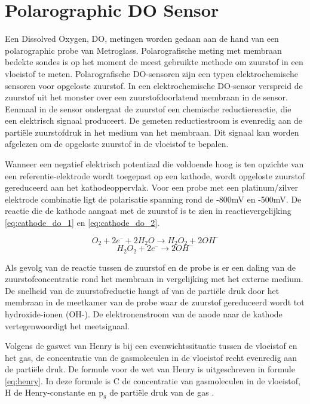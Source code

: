 \section{Polarographic DO Sensor}
Een Dissolved Oxygen, DO, metingen worden gedaan aan de hand van een polarographic probe van Metroglass. Polarografische meting met membraan bedekte sondes is op het moment de meest gebruikte methode om zuurstof in een vloeistof te meten. Polarografische DO-sensoren zijn een typen elektrochemische sensoren voor opgeloste zuurstof. In een elektrochemische DO-sensor verspreid de zuurstof uit het monster over een zuurstofdoorlatend membraan in de sensor. Eenmaal in de sensor ondergaat de zuurstof een chemische reductiereactie, die een elektrisch signaal produceert. De gemeten reductiestroom is evenredig aan de partiële zuurstofdruk in het medium van het membraan. Dit signaal kan worden afgelezen om de opgeloste zuurstof in de vloeistof te bepalen.

Wanneer een negatief elektrisch potentiaal die voldoende hoog is ten opzichte van een referentie-elektrode wordt toegepast op een kathode, wordt opgeloste zuurstof gereduceerd aan het kathodeoppervlak\cite{hamilton_do}. Voor een probe met een platinum/zilver elektrode combinatie ligt de polarisatie spanning rond de -800mV en -500mV. De reactie die de kathode aangaat met de zuurstof is te zien in reactievergelijking \ref{eq:cathode_do_1} en \ref{eq:cathode_do_2}\cite{linek_covered_probes}.

\begin{equation}\label{eq:cathode_do_1}
	O_{2} + 2e^{–} + 2H_{2}O\rightarrow H_{2}O_{2} + 2OH^{–}
\end{equation}
\begin{equation}\label{eq:cathode_do_2}
	H_{2}O_{2} + 2e^{–}\rightarrow 2OH^{-}
\end{equation}

Als gevolg van de reactie tussen de zuurstof en de probe is er een daling van de zuurstofconcentratie rond het membraan in vergelijking met het externe medium. De snelheid van de zuurstofreductie hangt af van de partiële druk door het membraan in de meetkamer van de probe waar de zuurstof gereduceerd wordt tot hydroxide-ionen (OH-)\cite{mt_do_measurement}. De elektronenstroom van de anode naar de kathode vertegenwoordigt het meetsignaal.

Volgens de gaswet van Henry is bij een evenwichtssituatie tussen de vloeistof en het gas, de concentratie van de gasmoleculen in de vloeistof recht evenredig aan de partiële druk. De formule voor de wet van Henry is uitgeschreven in formule \ref{eq:henry}. In deze formule is C de concentratie van gasmoleculen in de vloeistof, H de Henry-constante en p$_g$ de partiële druk van de gas \cite{henry}.

